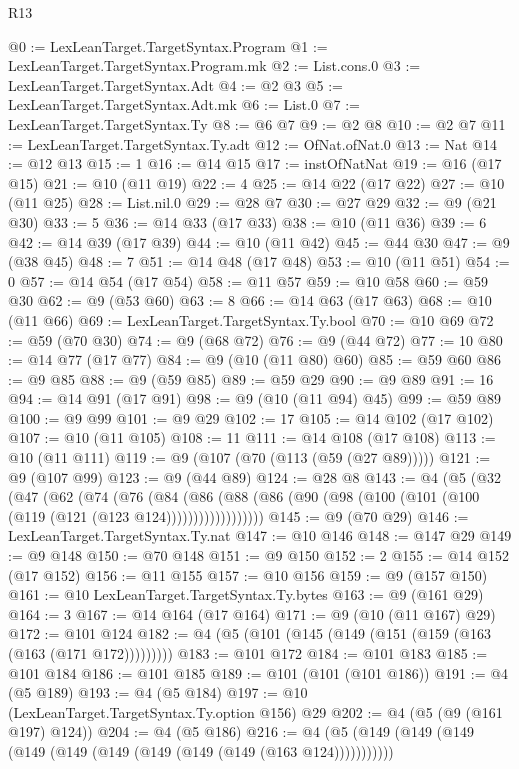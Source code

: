\begin{lexlean}{R13}
\begin{coremodule}
@0 := LexLeanTarget.TargetSyntax.Program
@1 := LexLeanTarget.TargetSyntax.Program.mk
@2 := List.cons.{0}
@3 := LexLeanTarget.TargetSyntax.Adt
@4 := @2 @3
@5 := LexLeanTarget.TargetSyntax.Adt.mk
@6 := List.{0}
@7 := LexLeanTarget.TargetSyntax.Ty
@8 := @6 @7
@9 := @2 @8
@10 := @2 @7
@11 := LexLeanTarget.TargetSyntax.Ty.adt
@12 := OfNat.ofNat.{0}
@13 := Nat
@14 := @12 @13
@15 := 1
@16 := @14 @15
@17 := instOfNatNat
@19 := @16 (@17 @15)
@21 := @10 (@11 @19)
@22 := 4
@25 := @14 @22 (@17 @22)
@27 := @10 (@11 @25)
@28 := List.nil.{0}
@29 := @28 @7
@30 := @27 @29
@32 := @9 (@21 @30)
@33 := 5
@36 := @14 @33 (@17 @33)
@38 := @10 (@11 @36)
@39 := 6
@42 := @14 @39 (@17 @39)
@44 := @10 (@11 @42)
@45 := @44 @30
@47 := @9 (@38 @45)
@48 := 7
@51 := @14 @48 (@17 @48)
@53 := @10 (@11 @51)
@54 := 0
@57 := @14 @54 (@17 @54)
@58 := @11 @57
@59 := @10 @58
@60 := @59 @30
@62 := @9 (@53 @60)
@63 := 8
@66 := @14 @63 (@17 @63)
@68 := @10 (@11 @66)
@69 := LexLeanTarget.TargetSyntax.Ty.bool
@70 := @10 @69
@72 := @59 (@70 @30)
@74 := @9 (@68 @72)
@76 := @9 (@44 @72)
@77 := 10
@80 := @14 @77 (@17 @77)
@84 := @9 (@10 (@11 @80) @60)
@85 := @59 @60
@86 := @9 @85
@88 := @9 (@59 @85)
@89 := @59 @29
@90 := @9 @89
@91 := 16
@94 := @14 @91 (@17 @91)
@98 := @9 (@10 (@11 @94) @45)
@99 := @59 @89
@100 := @9 @99
@101 := @9 @29
@102 := 17
@105 := @14 @102 (@17 @102)
@107 := @10 (@11 @105)
@108 := 11
@111 := @14 @108 (@17 @108)
@113 := @10 (@11 @111)
@119 := @9 (@107 (@70 (@113 (@59 (@27 @89)))))
@121 := @9 (@107 @99)
@123 := @9 (@44 @89)
@124 := @28 @8
@143 := @4
    (@5
      (@32
        (@47
          (@62
            (@74
              (@76
                (@84
                  (@86
                    (@88 (@86 (@90 (@98 (@100 (@101 (@100 (@119 (@121 (@123 @124))))))))))))))))))
@145 := @9 (@70 @29)
@146 := LexLeanTarget.TargetSyntax.Ty.nat
@147 := @10 @146
@148 := @147 @29
@149 := @9 @148
@150 := @70 @148
@151 := @9 @150
@152 := 2
@155 := @14 @152 (@17 @152)
@156 := @11 @155
@157 := @10 @156
@159 := @9 (@157 @150)
@161 := @10 LexLeanTarget.TargetSyntax.Ty.bytes
@163 := @9 (@161 @29)
@164 := 3
@167 := @14 @164 (@17 @164)
@171 := @9 (@10 (@11 @167) @29)
@172 := @101 @124
@182 := @4 (@5 (@101 (@145 (@149 (@151 (@159 (@163 (@163 (@171 @172)))))))))
@183 := @101 @172
@184 := @101 @183
@185 := @101 @184
@186 := @101 @185
@189 := @101 (@101 (@101 @186))
@191 := @4 (@5 @189)
@193 := @4 (@5 @184)
@197 := @10 (LexLeanTarget.TargetSyntax.Ty.option @156) @29
@202 := @4 (@5 (@9 (@161 @197) @124))
@204 := @4 (@5 @186)
@216 := @4 (@5 (@149 (@149 (@149 (@149 (@149 (@149 (@149 (@149 (@149 (@163 @124)))))))))))

\end{coremodule}
\end{lexlean}
